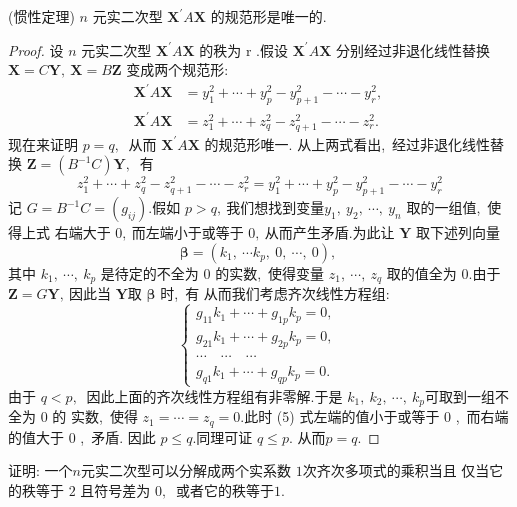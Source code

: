 \newpage
\begin{theorem}
	(惯性定理)  $n $ 元实二次型 $ \boldsymbol{X}^{\prime} A \boldsymbol{X} $ 的规范形是唯一的.
\end{theorem}
\begin{proof}
	设  $n $ 元实二次型 $ \boldsymbol{X}^{\prime} A \boldsymbol{X} $ 的秩为  r  .假设 $ \boldsymbol{X}^{\prime} A \boldsymbol{X} $ 分别经过非退化线性替换 $ \boldsymbol{X}=C \boldsymbol{Y},\  \boldsymbol{X}=B \boldsymbol{Z} $ 变成两个规范形:
	$$\begin{aligned}
		\boldsymbol{X}^{\prime} A \boldsymbol{X} & =y_{1}^{2}+\cdots+y_{p}^{2}-y_{p+1}^{2}-\cdots-y_{r}^{2},\  \\
		\boldsymbol{X}^{\prime} A \boldsymbol{X} & =z_{1}^{2}+\cdots+z_{q}^{2}-z_{q+1}^{2}-\cdots-z_{r}^{2} .
	\end{aligned}$$
	现在来证明 $ p=q ,\ $ 从而 $ \boldsymbol{X}^{\prime} A \boldsymbol{X} $ 的规范形唯一.
	从上两式看出,\  经过非退化线性替换 $ \boldsymbol{Z}=\left(B^{-1} C\right) \boldsymbol{Y} ,\ $ 有
	$$z_{1}^{2}+\cdots+z_{q}^{2}-z_{q+1}^{2}-\cdots-z_{r}^{2}=y_{1}^{2}+\cdots+y_{p}^{2}-y_{p+1}^{2}-\cdots-y_{r}^{2}$$
	记 $ G=B^{-1} C=\left(g_{i j}\right) .$假如  $p>q ,\  $我们想找到变量$  y_{1},\  y_{2},\  \cdots,\  y_{n} $ 取的一组值,\  使得上式 右端大于 $0 ,\  $而左端小于或等于 $0,\ $从而产生矛盾.为此让 $ \boldsymbol{Y} $ 取下述列向量
	$$\boldsymbol{\beta}=\left(k_{1},\  \cdots k_{p},\  0,\  \cdots,\  0\right),\ $$
	其中 $ k_{1},\  \cdots,\  k_{p} $ 是待定的不全为 $0$ 的实数,\  使得变量 $ z_{1},\  \cdots,\  z_{q} $ 取的值全为 $0.$由于 $ \boldsymbol{Z}=G \boldsymbol{Y} ,\  $因此当 $ \boldsymbol{Y}  $取  $\boldsymbol{\beta} $ 时,\ 有
	从而我们考虑齐次线性方程组:
	$$\left\{\begin{array}{l}
		g_{11} k_{1}+\cdots+g_{1 p} k_{p}=0,\  \\
		g_{21} k_{1}+\cdots+g_{2 p} k_{p}=0,\  \\
		\cdots \quad \cdots \quad \cdots \\
		g_{q 1} k_{1}+\cdots+g_{q p} k_{p}=0 .
	\end{array}\right.$$
	由于 $ q<p ,\ $ 因此上面的齐次线性方程组有非零解.于是 $ k_{1},\  k_{2},\  \cdots,\  k_{p}  $可取到一组不全为 0 的 实数,\  使得 $ z_{1}=\cdots=z_{q}=0 .$此时 (5) 式左端的值小于或等于 0 ,\  而右端的值大于 0 ,\  矛盾. 因此 $ p \leqslant q. $同理可证  $q \leqslant p.$ 从而$  p=q .$
\end{proof}
\newpage
\begin{problem}
	证明: 一个$  n  $元实二次型可以分解成两个实系数 $1 $次齐次多项式的乘积当且 仅当它的秩等于 $2$ 且符号差为 $0 ,\ $ 或者它的秩等于$ 1 .$
\end{problem}
